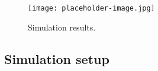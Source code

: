 
\begin{figure}[ht]
	\texttt{[image: placeholder-image.jpg]}
	\caption{Simulation results.}
\end{figure}

\subsection{Simulation setup}
